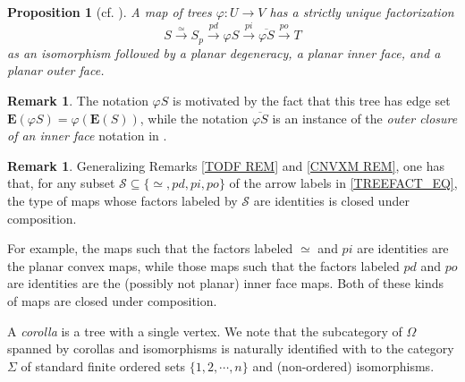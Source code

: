 \documentclass[a4paper,10pt
,draft
]{article}%
\numberwithin{equation}{section}
\numberwithin{figure}{section}
\newtheorem{proposition}[equation]{Proposition}%
\theoremstyle{definition} %
\newtheorem{remark}[equation]{Remark}%
\newtheorem{notation}[equation]{Notation}%
\newcommand{\1}{\ensuremath{\mathbbm 1}}%
\begin{document}
\begin{proposition}[{cf. \cite[Prop. 2.2]{BP_edss}}]
      \label{TREEFACT_PROP}
      A map of trees $\varphi \colon U \to V$ has a strictly unique factorization
\begin{equation}\label{TREEFACT_EQ}
	S \xrightarrow{\simeq} 
	S_p \xrightarrow{pd} 
	\varphi S \xrightarrow{pi} 
	\overline{\varphi S} \xrightarrow{po} T
\end{equation}
	as an isomorphism followed by a planar degeneracy, a planar inner face, and a planar outer face.
\end{proposition}


\begin{remark}\label{TREEFACT_REM}
      The notation $\varphi S$ is motivated by the fact that this tree has edge set
      $\boldsymbol{E}(\varphi S) = \varphi (\boldsymbol{E}(S))$,
      while the 
      notation $\overline{\varphi S}$ is an instance of the 
      \emph{outer closure of an inner face}
      notation in \cite[Not. 2.14]{BP_edss}.
\end{remark}



\begin{remark}
        \label{TREEMAPCOMP_REM}
	Generalizing Remarks \ref{TODF REM} and \ref{CNVXM REM},
	one has that, for any subset 
	$\mathcal{S} \subseteq \{\simeq,pd,pi,po\}$
	of the arrow labels 
	in \eqref{TREEFACT_EQ},
	the type of maps whose
	factors labeled by $\mathcal{S}$ are identities 
	is closed under composition.

	For example, the maps such that 
	the factors labeled $\simeq$ and $pi$
	are identities are the planar convex maps,
	while those maps such that
	the factors labeled $pd$ and $po$ 
	are identities are the 
	(possibly not planar) inner face maps.
	Both of these kinds of maps are closed under composition.	
\end{remark}


A \textit{corolla} is a tree with a single vertex.
We note that the subcategory of $\Omega$ spanned by corollas and isomorphisms is naturally identified with to the category $\Sigma$ of standard finite ordered sets
$\{1,2,\cdots,n\}$ and (non-ordered) isomorphisms.


\end{document}
